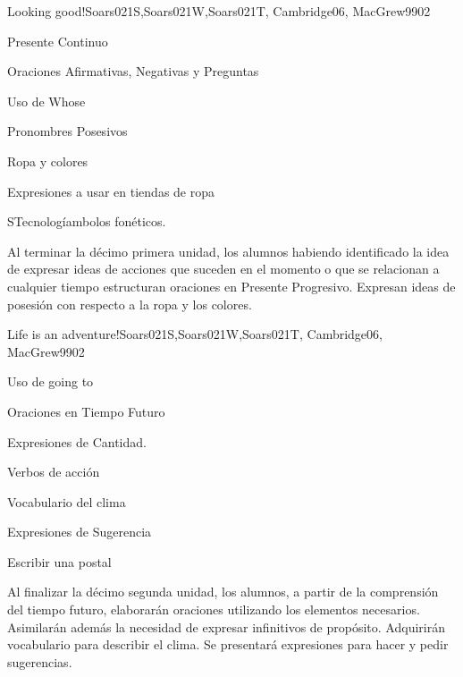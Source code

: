 \begin{syllabus}
\begin{unit}{Looking good!}{Soars021S,Soars021W,Soars021T, Cambridge06, MacGrew99}{0}{2}
   \begin{topics}
      \item Presente Continuo
      \item Oraciones Afirmativas, Negativas y Preguntas
      \item Uso de Whose
      \item Pronombres Posesivos
      \item Ropa y colores
      \item Expresiones a usar en tiendas de ropa
      \item STecnologíambolos fonéticos.
   \end{topics}

   \begin{unitgoals}
      \item Al terminar la décimo primera unidad, los alumnos habiendo identificado la idea de expresar ideas de acciones que suceden en el momento o que se relacionan a cualquier tiempo estructuran oraciones en Presente Progresivo. Expresan ideas de posesión con respecto a la ropa y los colores.
   \end{unitgoals}

\end{unit}

\begin{unit}{Life is an adventure!}{Soars021S,Soars021W,Soars021T, Cambridge06, MacGrew99}{0}{2}
   \begin{topics}
      \item Uso de going to
      \item Oraciones en Tiempo Futuro
      \item Expresiones de Cantidad.
      \item Verbos de acción
      \item Vocabulario del clima
      \item Expresiones de Sugerencia
      \item Escribir una postal
   \end{topics}
   \begin{unitgoals}
      \item Al finalizar la décimo segunda unidad, los alumnos, a partir de la comprensión del tiempo futuro, elaborarán oraciones utilizando los elementos necesarios. Asimilarán además la necesidad de expresar infinitivos de propósito. Adquirirán vocabulario para describir el clima. Se presentará expresiones para hacer y pedir sugerencias.
   \end{unitgoals}
\end{unit}


\end{syllabus}
